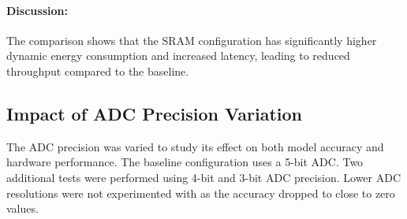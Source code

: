 \documentclass[11pt]{article}
\begin{document}
\paragraph{Discussion:}
The comparison shows that the SRAM configuration has significantly higher dynamic energy consumption and increased latency, leading to reduced throughput compared to the baseline.


\subsection{Impact of ADC Precision Variation}
The ADC precision was varied to study its effect on both model accuracy and hardware performance. The baseline configuration uses a 5-bit ADC. Two additional tests were performed using 4-bit and 3-bit ADC precision. Lower ADC resolutions were not experimented with as the accuracy dropped to close to zero values.
\end{document}

